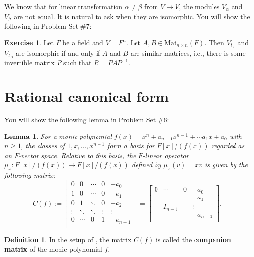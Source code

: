 \documentclass[12pt]{report}
\newtheorem{lemma}[theorem]{Lemma}
\numberwithin{equation}{section}
\numberwithin{theorem}{chapter}
\theoremstyle{definition}
\newtheorem{definition}[theorem]{Definition}
\newtheorem{exercise}{Exercise}
\newtheorem*{basic properties}{Basic Properties}
\newtheorem*{Important Remark}{Important Remark}
\newcommand{\df}[1]{{\bf #1}\index{#1}}
\begin{document}
We know that for linear transformation $\alpha\neq \beta$ from $V\to V$, the modules $V_\alpha$ and $V_\beta$ are not equal. It is natural to ask when they are isomorphic. You will show the following in Problem Set \#7:

\begin{exercise}
Let $F$ be a field and $V=F^n$. Let $A,B\in \mathrm{Mat}_{n\times n}(F)$. Then $V_{t_A}$ and $V_{t_B}$ are isomorphic if and only if $A$ and $B$ are similar matrices, i.e., there is some invertible matrix $P$ such that $B=PAP^{-1}$.
\end{exercise}


\section{Rational canonical form}

You will show the following lemma in Problem Set \#6:

\begin{lemma}\label{lem:companion}
For a monic polynomial $f(x) = x^n + a_{n-1}x^{n-1} +
  \cdots a_1 x + a_0$ with $n \geqslant 1$, the classes of $1, x, \dots,
  x^{n-1}$ form a basis for
  $F[x]/(f(x))$ regarded as an $F$-vector space. Relative to this basis, the $F$-linear operator $\mu_x: F[x]/(f(x)) \to F[x]/(f(x))$ defined by $\mu_x(v)=xv$ is given by the following matrix:
$$C(f) :=
\begin{bmatrix}
0 & 0 &\cdots & 0 & -a_0 \\
1 & 0 & \cdots & 0 & -a_1 \\
0 & 1 & \ddots & 0 & -a_2 \\
\vdots & \ddots & \ddots & \vdots & \vdots \\
0 & \cdots & 0 & 1 & -a_{n-1} \\
\end{bmatrix} = \begin{bmatrix}
0 & \cdots & 0 & -a_0 \\
&&& -a_1 \\
& I_{n-1}&& \vdots\\
&&& -a_{n-1} \\
\end{bmatrix}.$$
\end{lemma}


	

\begin{definition} 
In the setup of , the matrix $C(f)$ is called the \df{companion matrix} of the monic polynomial $f$.
\end{definition}
\end{document}
